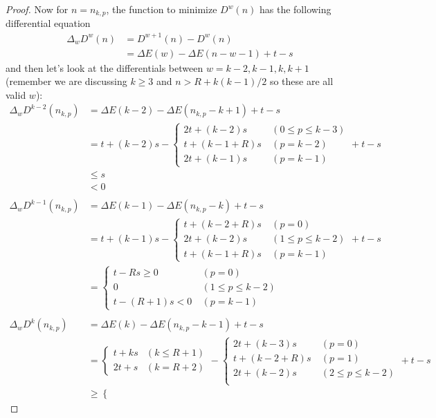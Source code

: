 \documentclass[]{article}
\begin{document}
\begin{proof}
Now for $n = n_{k, p}$, the function to minimize $D^w(n)$ has the following differential equation
\begin{align*}
\Delta_w D^w(n) &= D^{w+1}(n)-D^w(n) \\
&= \Delta E(w) - \Delta E(n-w-1) + t -s
\end{align*}
and then let's look at the differentials between $w = k-2, k-1, k, k+1$ (remember we are discussing $k\geq3$ and $n > R + k(k-1)/2 $ so these are all valid $w$):
\begin{align*}
\Delta_w D^{k-2}(n_{k,p}) &=  \Delta E(k-2) - \Delta E(n_{k,p}-k+1) + t -s \\
&= t+(k-2)s - \begin{cases}
2t + (k-2)s\ &(0\leq p \leq k-3)\\
t + (k-1+R)s\ &(p = k-2)\\
2t + (k-1)s\ &(p = k-1)
\end{cases} + t-s\\
&\leq s \\
&< 0 \\ \\
\Delta_w D^{k-1}(n_{k,p}) &=  \Delta E(k-1) - \Delta E(n_{k,p}-k) + t -s \\
&= t+(k-1)s - \begin{cases}
t + (k-2+R)s\ &(p =0)\\
2t + (k-2)s\ &(1\leq p\leq k-2)\\
t + (k-1+R)s\ &(p = k-1)
\end{cases} + t-s\\
&= \begin{cases}
t -Rs \geq 0\ &(p =0)\\
0\ &(1\leq p \leq k-2)\\
t -(R+1)s < 0\ &(p = k-1)
\end{cases}\\ \\
\Delta_w D^{k}(n_{k,p}) &=  \Delta E(k) - \Delta E(n_{k,p}-k-1) + t -s \\
&= \begin{cases}
t+ks &(k \leq R + 1)\\
2t+s&(k = R + 2)
\end{cases} - \begin{cases}
2t + (k-3)s\ &(p =0)\\
t + (k-2+R)s\ &(p =1)\\
2t + (k-2)s\ &(2\leq p \leq k-2)\\
\end{cases} + t-s\\
&\geq \begin{cases}

\end{cases}
\end{align*}
\end{proof}
\end{document}
